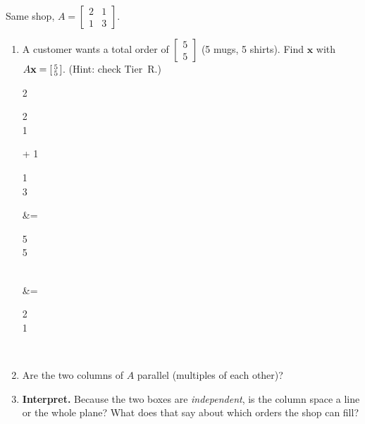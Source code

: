 \documentclass[10pt]{article}
\newcommand{\xx}{\mathbf{x}}
\begin{document}
\begin{tcolorbox}[colback=white, colframe=black!40, title=\textbf{Tier A --- Approaching Proficiency},
    fonttitle=\bfseries, arc=1.5mm, left=3mm, right=3mm, top=2mm, bottom=2mm, breakable]
Same shop, $A=\begin{bmatrix} 2 & 1 \\ 1 & 3 \end{bmatrix}$.
\begin{enumerate}[leftmargin=1.7em, itemsep=8pt]
  \item A customer wants a total order of $\begin{bmatrix} 5 \\ 5 \end{bmatrix}$ (5 mugs, 5 shirts).
        Find $\xx$ with $A\xx=\begin{bsmallmatrix} 5\\5 \end{bsmallmatrix}$. (Hint: check Tier~R.)
\begin{work}
  2\begin{bsmallmatrix} 2\\1 \end{bsmallmatrix} + 1\begin{bsmallmatrix} 1\\3 \end{bsmallmatrix}
      &= \begin{bsmallmatrix} 5\\5 \end{bsmallmatrix} \\
  \xx &= \begin{bsmallmatrix} 2\\1 \end{bsmallmatrix}
      \ 
\end{work}
  \item Are the two columns of $A$ parallel (multiples of each other)? \writeline
  \item \textbf{Interpret.} Because the two boxes are \emph{independent}, is the column space a
        line or the whole plane? What does that say about which orders the shop can fill? 
\end{enumerate}
\end{tcolorbox}
\end{document}

